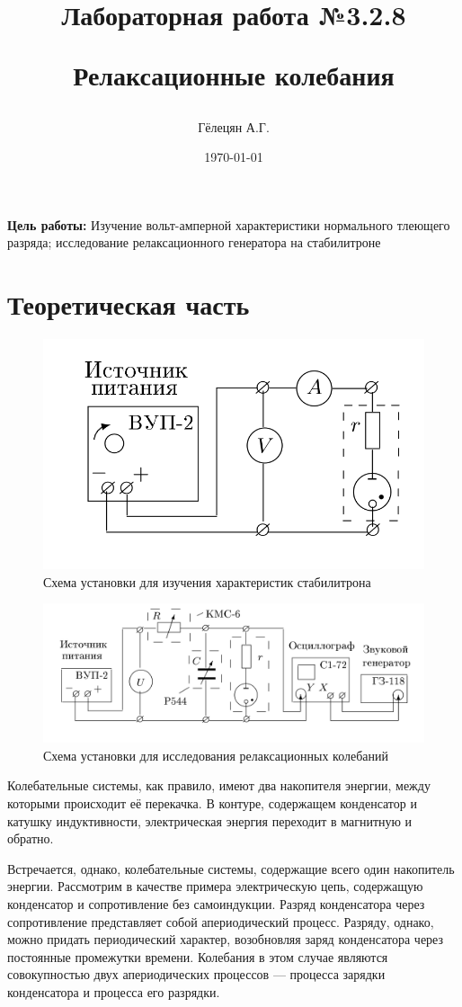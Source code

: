 \documentclass{article}
\title{\begin{center}Лабораторная работа №3.2.8\end{center}
Релаксационные колебания}
\author{Гёлецян А.Г.}
\date{\today}
\begin{document}
\maketitle
\newpage
{}

\textbf{Цель работы:} Изучение вольт-амперной характеристики нормального тлеющего
разряда; исследование релаксационного генератора на стабилитроне

\section{Теоретическая часть}

\begin{figure}[h]
    \center\includegraphics[width = 0.6\linewidth]{ust1.png}
    \caption{Схема установки для изучения характеристик стабилитрона}
\end{figure}
\begin{figure}[h]
    \center\includegraphics[width = 0.6\linewidth]{ust2.png}
    \caption{Схема установки для исследования релаксационных колебаний}
\end{figure}

Колебательные системы, как правило, имеют два накопителя энергии, между которыми
происходит её перекачка. В контуре, содержащем конденсатор и катушку индуктивности,
электрическая энергия переходит в магнитную и обратно.

Встречается, однако, колебательные системы, содержащие всего один накопитель энергии.
Рассмотрим в качестве примера электрическую цепь, содержащую конденсатор и 
сопротивление без самоиндукции. Разряд конденсатора через сопротивление представляет
собой апериодический процесс. Разряду, однако, можно придать периодический характер,
возобновляя заряд конденсатора через постоянные промежутки времени. Колебания в этом
случае являются совокупностью двух апериодических процессов --- процесса зарядки
конденсатора и процесса его разрядки.
\end{document}

